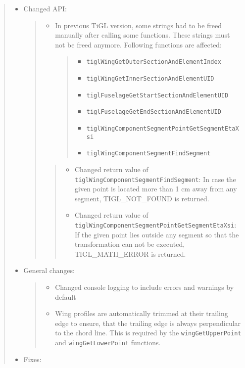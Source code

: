 \documentclass[]{scrartcl}
\begin{document}
\begin{quote}
\begin{itemize}
\item
  Changed API:

  \begin{quote}
  \begin{itemize}
  \item
    In previous TiGL version, some strings had to be freed manually
    after calling some functions. These strings must not be freed
    anymore. Following functions are affected:

    \begin{quote}
    \begin{itemize}
    \itemsep1pt\parskip0pt
    \item
      \texttt{tiglWingGetOuterSectionAndElementIndex}
    \item
      \texttt{tiglWingGetInnerSectionAndElementUID}
    \item
      \texttt{tiglFuselageGetStartSectionAndElementUID}
    \item
      \texttt{tiglFuselageGetEndSectionAndElementUID}
    \item
      \texttt{tiglWingComponentSegmentPointGetSegmentEtaXsi}
    \item
      \texttt{tiglWingComponentSegmentFindSegment}
    \end{itemize}
    \end{quote}
  \end{itemize}

  \begin{quote}
  \begin{itemize}
  \itemsep1pt\parskip0pt
  \item
    Changed return value of
    \texttt{tiglWingComponentSegmentFindSegment}: In case the given
    point is located more than 1 cm away from any segment,
    TIGL\_NOT\_FOUND is returned.
  \item
    Changed return value of
    \texttt{tiglWingComponentSegmentPointGetSegmentEtaXsi}: If the given
    point lies outside any segment so that the transformation can not be
    executed, TIGL\_MATH\_ERROR is returned.
  \end{itemize}
  \end{quote}
  \end{quote}
\item
  General changes:

  \begin{quote}
  \begin{itemize}
  \itemsep1pt\parskip0pt
  \item
    Changed console logging to include errors and warnings by default
  \item
    Wing profiles are automatically trimmed at their trailing edge to
    ensure, that the trailing edge is always perpendicular to the chord
    line. This is required by the \texttt{wingGetUpperPoint} and
    \texttt{wingGetLowerPoint} functions.
  \end{itemize}
  \end{quote}
\item
  Fixes:


\end{itemize}
\end{quote}
\end{document}
